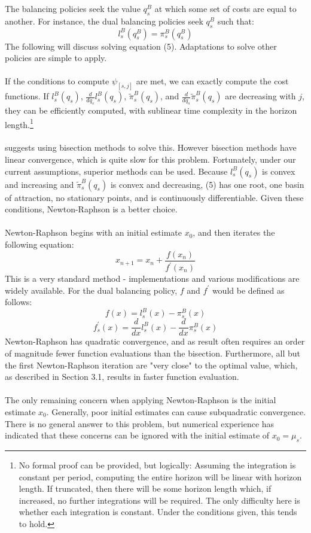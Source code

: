 \documentclass[12pt]{article}
\begin{document}
The balancing policies seek the value $q_s^B$ at which some set of costs are equal to another. For instance, the dual balancing policies seek $q_s^B$ such that:
\begin{equation}
	l_s^B(q_s^B) = \pi_s^B(q_s^B)
\end{equation}
The following will discuss solving equation (5). Adaptations to solve other policies are simple to apply. \\
\\
If the conditions to compute $\psi_{[s, j]}$ are met, we can exactly compute the cost functions. If $l_s^B(q_s)$, $\frac{d}{d q_s} l_s^B(q_s)$, $\tilde{\pi}_s^B(q_s)$, and $\frac{d}{d q_s} \tilde{\pi}_s^B(q_s)$ are decreasing with $j$, they can be efficiently computed, with sublinear time complexity in the horizon length.\footnote{No formal proof can be provided, but logically: Assuming the integration is constant per period, computing the entire horizon will be linear with horizon length. If truncated, then there will be some horizon length which, if increased, no further integrations will be required. The only difficulty here is whether each integration is constant. Under the conditions given, this tends to hold.} \\
\\
\cite{levi:2007} suggests using bisection methods to solve this. However bisection methods have linear convergence, which is quite slow for this problem. Fortunately, under our current assumptions, superior methods can be used. Because $l_s^B(q_s)$ is convex and increasing and $\tilde{\pi}_s^B(q_s)$ is convex and decreasing, (5) has one root, one basin of attraction, no stationary points, and is continuously differentiable. Given these conditions, Newton-Raphson is a better choice. \\
\\
Newton-Raphson begins with an initial estimate $x_0$, and then iterates the following equation:
$$
	x_{n+1} = x_n + \frac{f(x_n)}{f^{\prime}(x_n)}
$$
This is a very standard method - implementations and various modifications are widely available. For the dual balancing policy, $f$ and $f^{\prime}$ would be defined as follows:
$$
	f(x) = l_s^B(x) - \pi_s^B(x) 
$$
$$
	f_s^{\prime}(x) =  \frac{d}{dx} l_s^B(x) - \frac{d}{dx} \pi_s^B(x) 
$$
Newton-Raphson has quadratic convergence, and as result often requires an order of magnitude fewer function evaluations than the bisection. Furthermore, all but the first Newton-Raphson iteration are "very close" to the optimal value, which, as described in Section 3.1, results in faster function evaluation. \\
\\
The only remaining concern when applying Newton-Raphson is the initial estimate $x_0$. Generally, poor initial estimates can cause subquadratic convergence. There is no general answer to this problem, but numerical experience has indicated that these concerns can be ignored with the initial estimate of $x_0 = \mu_s$.
\end{document}
